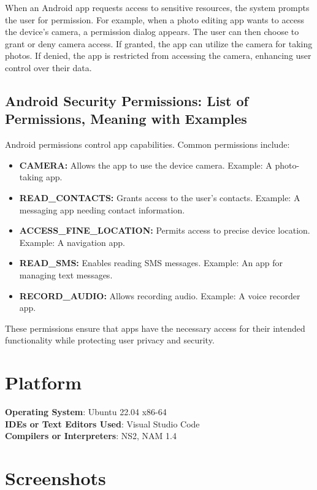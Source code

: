 \documentclass[11pt]{article}
\begin{document}
When an Android app requests access to sensitive resources, the system prompts the user for permission. For example, when a photo editing app wants to access the device's camera, a permission dialog appears. The user can then choose to grant or deny camera access. If granted, the app can utilize the camera for taking photos. If denied, the app is restricted from accessing the camera, enhancing user control over their data.

\subsection{Android Security Permissions: List of Permissions, Meaning with Examples}

Android permissions control app capabilities. Common permissions include:

\begin{itemize}
    \item \textbf{CAMERA:} Allows the app to use the device camera. Example: A photo-taking app.
    \item \textbf{READ\_CONTACTS:} Grants access to the user's contacts. Example: A messaging app needing contact information.
    \item \textbf{ACCESS\_FINE\_LOCATION:} Permits access to precise device location. Example: A navigation app.
    \item \textbf{READ\_SMS:} Enables reading SMS messages. Example: An app for managing text messages.
    \item \textbf{RECORD\_AUDIO:} Allows recording audio. Example: A voice recorder app.
\end{itemize}

These permissions ensure that apps have the necessary access for their intended functionality while protecting user privacy and security.



\section{Platform}
\textbf{Operating System}: Ubuntu 22.04 x86-64 \\
\textbf{IDEs or Text Editors Used}: Visual Studio Code\\
\textbf{Compilers or Interpreters}: NS2, NAM 1.4\\

\section{Screenshots}
\end{document}
